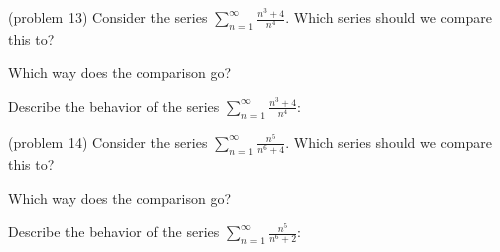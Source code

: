 \documentclass[handout]{ximera}
\begin{document}
\begin{problem}(problem 13)
Consider the series $\displaystyle{\sum_{n=1}^\infty \frac{n^3+4}{n^4}}$.
Which series should we compare this to?

\begin{multipleChoice}
\end{multipleChoice}

Which way does the comparison go?
\begin{multipleChoice}
\end{multipleChoice}

Describe the behavior of the series $\sum_{n=1}^\infty \frac{n^3 + 4}{n^4}:$
\begin{multipleChoice}
\end{multipleChoice}

\end{problem}





\begin{problem}(problem 14)
Consider the series $\displaystyle{\sum_{n=1}^\infty \frac{n^5}{n^6 + 4}}$.
Which series should we compare this to?

\begin{multipleChoice}
\end{multipleChoice}

Which way does the comparison go?
\begin{multipleChoice}
\end{multipleChoice}

Describe the behavior of the series $\sum_{n=1}^\infty \frac{n^5}{n^6 + 2}:$
\begin{multipleChoice}
\end{multipleChoice}

\end{problem}
\end{document}
